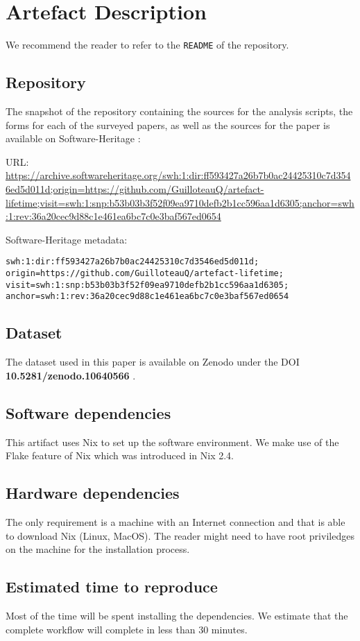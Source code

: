 \documentclass[sigconf,natbib=false]{acmart}
\begin{document}
\newpage

\appendix

\section{Artefact Description}

We recommend the reader to refer to the \texttt{README} of the repository.

\subsection{Repository}

The snapshot of the repository containing the sources for the analysis scripts, the forms for each of the surveyed papers, as well as the sources for the paper is available on Software-Heritage \cite{artefact-lifetime}:

URL: \url{https://archive.softwareheritage.org/swh:1:dir:ff593427a26b7b0ac24425310c7d3546ed5d011d;origin=https://github.com/GuilloteauQ/artefact-lifetime;visit=swh:1:snp:b53b03b3f52f09ea9710defb2b1cc596aa1d6305;anchor=swh:1:rev:36a20cec9d88c1e461ea6bc7c0e3baf567ed0654}


Software-Heritage metadata:

\begin{verbatim}
swh:1:dir:ff593427a26b7b0ac24425310c7d3546ed5d011d;
origin=https://github.com/GuilloteauQ/artefact-lifetime;
visit=swh:1:snp:b53b03b3f52f09ea9710defb2b1cc596aa1d6305;
anchor=swh:1:rev:36a20cec9d88c1e461ea6bc7c0e3baf567ed0654
\end{verbatim}

\subsection{Dataset}

The dataset used in this paper is available on Zenodo under the DOI \textbf{10.5281/zenodo.10640566} \cite{guilloteau_2024_10640566}.

\subsection{Software dependencies}

This artifact uses Nix to set up the software environment.
We make use of the Flake feature of Nix which was introduced in Nix 2.4.

\subsection{Hardware dependencies}

The only requirement is a machine with an Internet connection and that is able to download Nix (Linux, MacOS).
The reader might need to have root priviledges on the machine for the installation process.

\subsection{Estimated time to reproduce}

Most of the time will be spent installing the dependencies.
We estimate that the complete workflow will complete in less than 30 minutes.
\end{document}
